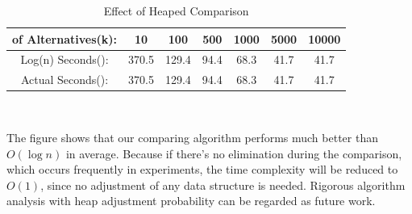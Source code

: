 \begin{table}[ht]
\begin{center}
\begin{tabular}{|c|c|c|c|c|c|c|}
\hline
of Alternatives(k): & 10 & 100 & 500 & 1000 & 5000 & 10000 \\
\hline
Log(n) Seconds(): & 370.5 & 129.4 & 94.4 & 68.3 & 41.7 & 41.7 \\
\hline
Actual Seconds(): & 370.5 & 129.4 & 94.4 & 68.3 & 41.7 & 41.7 \\
\hline
\end{tabular} \\
\caption{Effect of Heaped Comparison}
\end{center}
\end{table}

The figure shows that our comparing algorithm performs much better than $O(\log n)$ in average. Because if there's no elimination during the comparison, which occurs frequently in experiments, the time complexity will be reduced to $O(1)$, since no adjustment of any data structure is needed. Rigorous algorithm analysis with heap adjustment probability can be regarded as future work.